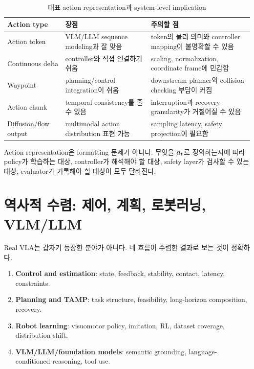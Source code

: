 \begin{table}[ht]
\centering
\caption{대표 action representation과 system-level implication}
\label{tab:action-rep}
\small
\begin{tabularx}{\textwidth}{p{28mm}X X}
\toprule
Action type & 장점 & 주의할 점 \\
\midrule
Action token & VLM/LLM sequence modeling과 잘 맞음 & token의 물리 의미와 controller mapping이 불명확할 수 있음 \\
Continuous delta & controller와 직접 연결하기 쉬움 & scaling, normalization, coordinate frame에 민감함 \\
Waypoint & planning/control integration이 쉬움 & downstream planner와 collision checking 부담이 커짐 \\
Action chunk & temporal consistency를 줄 수 있음 & interruption과 recovery granularity가 거칠어질 수 있음 \\
Diffusion/flow output & multimodal action distribution 표현 가능 & sampling latency, safety projection이 필요함 \\
\bottomrule
\end{tabularx}
\end{table}

Action representation은 formatting 문제가 아니다. 무엇을 $\bm{a}_t$로 정의하는지에 따라 policy가 학습하는 대상, controller가 해석해야 할 대상, safety layer가 검사할 수 있는 대상, evaluator가 기록해야 할 대상이 모두 달라진다.

\section{역사적 수렴: 제어, 계획, 로봇러닝, VLM/LLM}

Real VLA는 갑자기 등장한 분야가 아니다. 네 흐름이 수렴한 결과로 보는 것이 정확하다.

\begin{enumerate}
  \item \textbf{Control and estimation}: state, feedback, stability, contact, latency, constraints.
  \item \textbf{Planning and TAMP}: task structure, feasibility, long-horizon composition, recovery.
  \item \textbf{Robot learning}: visuomotor policy, imitation, RL, dataset coverage, distribution shift.
  \item \textbf{VLM/LLM/foundation models}: semantic grounding, language-conditioned reasoning, tool use.
\end{enumerate}

